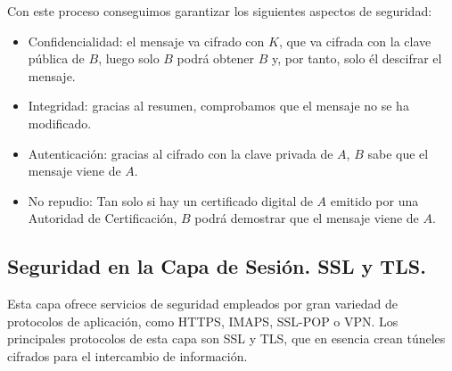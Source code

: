 Con este proceso conseguimos garantizar los siguientes aspectos de seguridad:
\begin{itemize}
    \item Confidencialidad: el mensaje va cifrado con $K$, que va cifrada con la clave pública de $B$, luego solo $B$ podrá obtener $B$ y, por tanto, solo él descifrar el mensaje.
    \item Integridad: gracias al resumen, comprobamos que el mensaje no se ha modificado.
    \item Autenticación: gracias al cifrado con la clave privada de $A$, $B$ sabe que el mensaje viene de $A$.
    \item No repudio: Tan solo si hay un certificado digital de $A$ emitido por una Autoridad de Certificación, $B$ podrá demostrar que el mensaje viene de $A$.
\end{itemize}


\subsection{Seguridad en la Capa de Sesión. \acrshort{SSL} y \acrshort{TLS}.}

Esta capa ofrece servicios de seguridad empleados por gran variedad de protocolos de aplicación, como \acrshort{HTTPS}, \acrshort{IMAPS}, \acrshort{SSL}-\acrshort{POP} o \acrshort{VPN}. Los principales protocolos de esta capa son \acrshort{SSL} y \acrshort{TLS}, que en esencia crean túneles cifrados para el intercambio de información.

